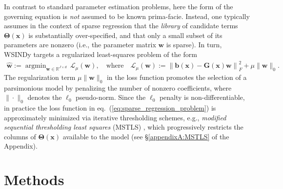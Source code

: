 \documentclass[journal=gmj]{CUP-JNL-DTM}%
\DeclareMathOperator*{\argmin}{argmin}
\theoremstyle{definition}
\numberwithin{equation}{section}
\begin{document}
In contrast to standard parameter estimation problems, here the form of the governing equation is \textit{not} assumed to be known prima-facie. Instead, one typically assumes in the context of sparse regression that the \textit{library} of candidate terms $\mathbf{\Theta}(\boldsymbol{x})$ is substantially over-specified, and that only a small subset of its parameters are nonzero (i.e., the parameter matrix $\mathbf{w}$ is sparse). In turn, WSINDy targets a regularized least-squares problem of the form \begin{align}\label{eq:sparse_regression_problem}
    \hat{\mathbf{w}} := \argmin_{\mathbf{w} \in \mathbb{R}^{J \times d}} \, \mathcal{L}_{\mu}(\mathbf{w}),
    \quad \text{where} \quad
    \mathcal{L}_{\mu}(\mathbf{w}) := \left\|\mathbf{b}(\boldsymbol{x}) - \mathbf{G}(\boldsymbol{x})\mathbf{w}\right\|^2_F + \mu\|\mathbf{w}\|_0.
\end{align} The regularization term $\mu \|\mathbf{w}\|_0$ in the loss function promotes the selection of a parsimonious model by penalizing the number of nonzero coefficients, where $\|\cdot\|_0$ denotes the $\ell_0$ pseudo-norm. Since the $\ell_0$ penalty is non-differentiable, in practice the loss function in eq.~(\ref{eq:sparse_regression_problem}) is approximately minimized via iterative thresholding schemes, e.g., \textit{modified sequential thresholding least squares} (MSTLS) \cite{Brunton.etal2016ProcNatlAcadSciUSA, Messenger.Bortz2021JournalofComputationalPhysics}, which progressively restricts the columns of $\boldsymbol{\Theta}(\boldsymbol{x})$ available to the model (see \S\ref{appendixA:MSTLS} of the Appendix).

\newpage

\section{Methods}\label{sec:methods}
\end{document}
